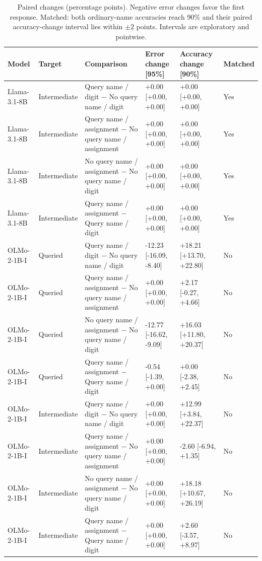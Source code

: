 \begin{table}[t]
\centering\small\setlength{\tabcolsep}{3pt}
\begin{tabular}{@{}p{}p{}p{}p{}p{}p{}@{}}
\toprule
Model & Target & Comparison & Error change [95\%] & Accuracy change [90\%] & Matched \\
\midrule
Llama-3.1-8B & Intermediate & Query name / digit $-$ No query name / digit & +0.00 [+0.00, +0.00] & +0.00 [+0.00, +0.00] & Yes \\
Llama-3.1-8B & Intermediate & Query name / assignment $-$ No query name / assignment & +0.00 [+0.00, +0.00] & +0.00 [+0.00, +0.00] & Yes \\
Llama-3.1-8B & Intermediate & No query name / assignment $-$ No query name / digit & +0.00 [+0.00, +0.00] & +0.00 [+0.00, +0.00] & Yes \\
Llama-3.1-8B & Intermediate & Query name / assignment $-$ Query name / digit & +0.00 [+0.00, +0.00] & +0.00 [+0.00, +0.00] & Yes \\
OLMo-2-1B-I & Queried & Query name / digit $-$ No query name / digit & -12.23 [-16.09, -8.40] & +18.21 [+13.70, +22.80] & No \\
OLMo-2-1B-I & Queried & Query name / assignment $-$ No query name / assignment & +0.00 [+0.00, +0.00] & +2.17 [-0.27, +4.66] & No \\
OLMo-2-1B-I & Queried & No query name / assignment $-$ No query name / digit & -12.77 [-16.62, -9.09] & +16.03 [+11.80, +20.37] & No \\
OLMo-2-1B-I & Queried & Query name / assignment $-$ Query name / digit & -0.54 [-1.39, +0.00] & +0.00 [-2.38, +2.45] & No \\
OLMo-2-1B-I & Intermediate & Query name / digit $-$ No query name / digit & +0.00 [+0.00, +0.00] & +12.99 [+3.84, +22.37] & No \\
OLMo-2-1B-I & Intermediate & Query name / assignment $-$ No query name / assignment & +0.00 [+0.00, +0.00] & -2.60 [-6.94, +1.35] & No \\
OLMo-2-1B-I & Intermediate & No query name / assignment $-$ No query name / digit & +0.00 [+0.00, +0.00] & +18.18 [+10.67, +26.19] & No \\
OLMo-2-1B-I & Intermediate & Query name / assignment $-$ Query name / digit & +0.00 [+0.00, +0.00] & +2.60 [-3.57, +8.97] & No \\
\bottomrule
\end{tabular}
\caption{Paired changes (percentage points). Negative error changes favor the first response. Matched: both ordinary-name accuracies reach 90\% and their paired accuracy-change interval lies within $\pm2$ points. Intervals are exploratory and pointwise.}
\label{tab:r7-final_query-contrasts-2}
\end{table}
